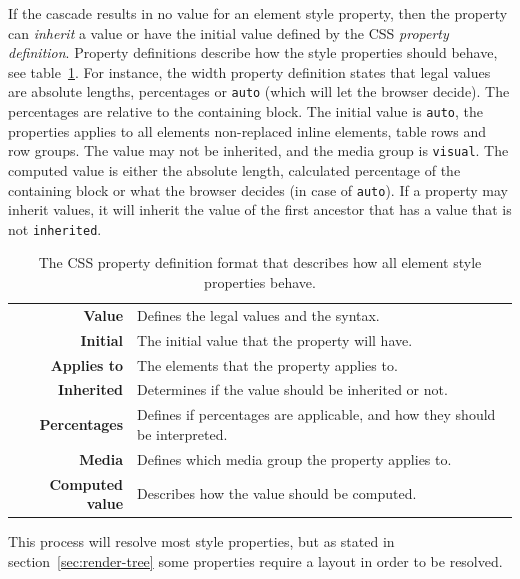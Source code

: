 \documentclass[a4paper,11pt]{kth-mag}
\newcommand{\code}[1]{\texttt{#1}}
\newcommand\abbr[2][]{\uppercase{#2}\ifthenelse{\equal{#1}{}}%
                     {}{#1}}
\begin{document}
        If the cascade results in no value for an element style property, then the property can \emph{inherit} a value or have the initial value defined by the \abbr{css} \emph{property definition}.
        Property definitions describe how the style properties should behave, see table~\ref{table:css_property_definition}.
        For instance, the width property definition states that legal values are absolute lengths, percentages or \code{auto} (which will let the browser decide).
        The percentages are relative to the containing block.
        The initial value is \code{auto}, the properties applies to all elements non-replaced inline elements, table rows and row groups.
        The value may not be inherited, and the media group is \code{visual}.
        The computed value is either the absolute length, calculated percentage of the containing block or what the browser decides (in case of \code{auto}).
        If a property may inherit values, it will inherit the value of the first ancestor that has a value that is not \code{inherited}.

        \begin{table}[ht]\center
          \tiny
          \begin{tabular}[t]{ r | l }
            \textbf{Value} & Defines the legal values and the syntax. \\
            \textbf{Initial} & The initial value that the property will have. \\
            \textbf{Applies to} & The elements that the property applies to. \\
            \textbf{Inherited} & Determines if the value should be inherited or not. \\
            \textbf{Percentages} & Defines if percentages are applicable, and how they should be interpreted. \\
            \textbf{Media} & Defines which media group the property applies to. \\
            \textbf{Computed value} & Describes how the value should be computed. \\
          \end{tabular}
          \caption{The \abbr{css} property definition format that describes how all element style properties behave.}
          \label{table:css_property_definition}
        \end{table}

        This process will resolve most style properties, but as stated in section~\ref{sec:render-tree} some properties require a layout in order to be resolved.
\end{document}
